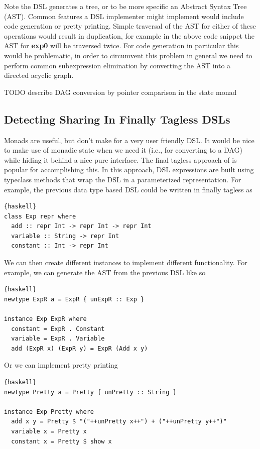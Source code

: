 \documentclass[runningheads]{llncs}
\begin{document}
Note the DSL generates a tree, or to be more specific an Abstract Syntax Tree
(AST). Common features a DSL implementer might implement would include code
generation or pretty printing. Simple traversal of the AST for either of these
operations would result in duplication, for example in the above code snippet
the AST for {\bf exp0} will be traversed twice. For code generation in
particular this would be problematic, in order to circumvent this problem in
general we need to perform common subexpression elimination by converting the
AST into a directed acyclic graph. %

TODO describe DAG conversion by pointer comparison in the state monad

\subsection{Detecting Sharing In Finally Tagless DSLs}

Monads are useful, but don't make for a very user friendly DSL. It would be nice
to make use of monadic state when we need it (i.e., for converting to a DAG)
while hiding it behind a nice pure interface. The final tagless approach of
\cite{carette:finallytagless} is popular for accomplishing this. In this
approach, DSL expressions are built using typeclass methods that wrap the DSL in
a parameterized representation. For example, the previous data type based DSL
could be written in finally tagless as

\begin{lstlisting}{haskell}
class Exp repr where
  add :: repr Int -> repr Int -> repr Int
  variable :: String -> repr Int
  constant :: Int -> repr Int
\end{lstlisting}

We can then create different instances to implement different functionality.
For example, we can generate the AST from the previous DSL like so
\begin{lstlisting}{haskell}
newtype ExpR a = ExpR { unExpR :: Exp }

instance Exp ExpR where
  constant = ExpR . Constant
  variable = ExpR . Variable
  add (ExpR x) (ExpR y) = ExpR (Add x y)
\end{lstlisting}

Or we can implement pretty printing
\begin{lstlisting}{haskell}
newtype Pretty a = Pretty { unPretty :: String }

instance Exp Pretty where
  add x y = Pretty $ "("++unPretty x++") + ("++unPretty y++")"
  variable x = Pretty x
  constant x = Pretty $ show x
\end{lstlisting}
\end{document}
